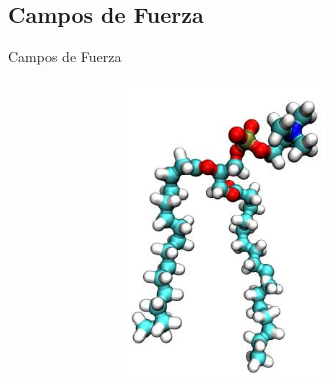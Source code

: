 \documentclass[8pt]{beamer}
\begin{document}
\subsection{Campos de Fuerza}
\begin{frame}[t]{Campos de Fuerza}
\justifying


\begin{figure}
\begin{figure}[ht]
\centering
\hspace*{\fill}
\begin{subfigure}[t]{.32\textwidth}
  \vspace{-1cm}
  \centering
  \includegraphics[width=0.75\textwidth]{Figure/FF-AA.png}
\end{subfigure}
\end{figure}
\end{figure}
\end{frame}
\end{document}
